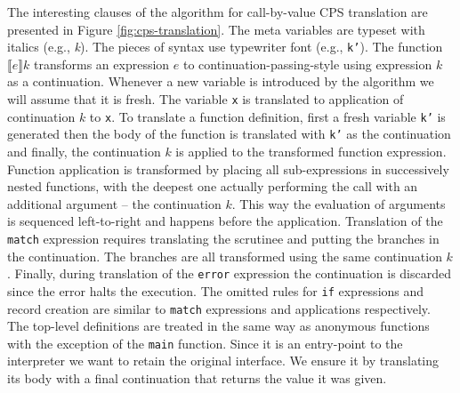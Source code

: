 The interesting clauses of the algorithm for call-by-value CPS translation are presented in Figure \ref{fig:cps-translation}. The meta variables are typeset with italics (e.g., \textit{k}).
The pieces of syntax use typewriter font (e.g., \texttt{k'}). The function $ \llbracket e \rrbracket k $ transforms an expression $e$ to continuation-passing-style using expression $k$ as a continuation.
Whenever a new variable is introduced by the algorithm we will assume that it is fresh.
The variable \texttt{x} is translated to application of continuation $k$ to \texttt{x}.
To translate a function definition, first a fresh variable \texttt{k'} is generated then the body of the function is translated with \texttt{k'} as the continuation and finally, the continuation $k$ is applied to the transformed function expression.
Function application is transformed by placing all sub-expressions in successively nested functions, with the deepest one actually performing the call with an additional argument -- the continuation $k$.
This way the evaluation of arguments is sequenced left-to-right and happens before the application.
Translation of the \texttt{match} expression requires translating the scrutinee and putting the branches in the continuation. The branches are all transformed using the same continuation $k$.
Finally, during translation of the \texttt{error} expression the continuation is discarded since the error halts the execution.
The omitted rules for \texttt{if} expressions and record creation are similar to \texttt{match} expressions and applications respectively.
The top-level definitions are treated in the same way as anonymous functions with the exception of the \texttt{main} function.
Since it is an entry-point to the interpreter we want to retain the original interface.
We ensure it by translating its body with a final continuation that returns the value it was given.

